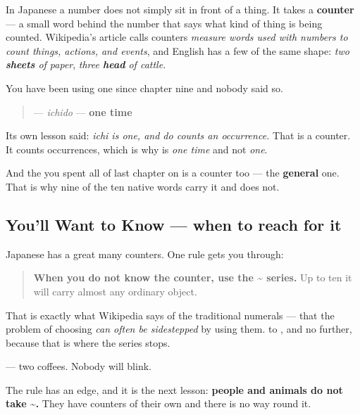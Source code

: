 \begin{grammarlens}[title={Grammar Lens — a number cannot stand alone}]
In Japanese a number does not simply sit in front of a thing. It takes a \textbf{counter} — a small word behind the number that says what kind of thing is being counted. Wikipedia's article calls counters \emph{measure words used with numbers to count things, actions, and events}, and English has a few of the same shape: \emph{two \textbf{sheets} of paper}, \emph{three \textbf{head} of cattle}.

You have been using one since chapter nine and nobody said so.

\begin{quote}
\textbf{} — \emph{ichido} — \textbf{one time}
\end{quote}

Its own lesson said: \emph{ichi is one, and do counts an occurrence.} That \textbf{} is a counter. It counts occurrences, which is why \textbf{} is \emph{one time} and not \emph{one}.

And the \textbf{} you spent all of last chapter on is a counter too — the \textbf{general} one. That is why nine of the ten native words carry it and \textbf{} does not.
\end{grammarlens}

\subsection*{You'll Want to Know — when to reach for it}
Japanese has a great many counters. One rule gets you through:

\begin{quote}
\textbf{When you do not know the counter, use the \textasciitilde{} series.} Up to ten it will carry almost any ordinary object.
\end{quote}

That is exactly what Wikipedia says of the traditional numerals — that the problem of choosing \emph{can often be sidestepped} by using them. \textbf{} to \textbf{}, and no further, because that is where the series stops.

\textbf{ } — two coffees. Nobody will blink.

The rule has an edge, and it is the next lesson: \textbf{people and animals do not take \textasciitilde{}.} They have counters of their own and there is no way round it.

